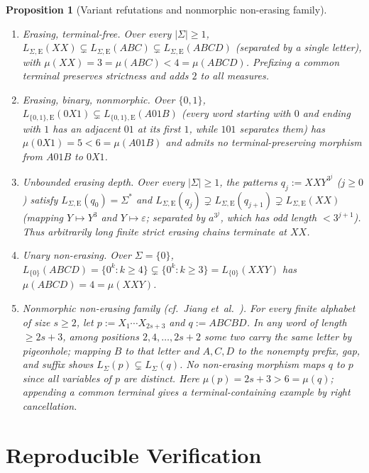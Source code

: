 \documentclass[11pt]{article}
\theoremstyle{plain}
\newtheorem{proposition}[theorem]{Proposition}
\theoremstyle{definition}
\theoremstyle{remark}
\begin{document}
\begin{proposition}[Variant refutations and nonmorphic non-erasing family]\label{prop:variants}
\leavevmode
\begin{enumerate}[label=\textup{(\arabic*)}]
\item \emph{Erasing, terminal-free.} Over every $|\Sigma| \ge 1$, $L_{\Sigma,\mathrm{E}}(XX) \subsetneq L_{\Sigma,\mathrm{E}}(ABC) \subsetneq L_{\Sigma,\mathrm{E}}(ABCD)$ (separated by a single letter), with $\mu(XX) = 3 = \mu(ABC) < 4 = \mu(ABCD)$. Prefixing a common terminal preserves strictness and adds $2$ to all measures.
\item \emph{Erasing, binary, nonmorphic.} Over $\{0,1\}$, $L_{\{0,1\},\mathrm{E}}(0X1) \subsetneq L_{\{0,1\},\mathrm{E}}(A01B)$ (every word starting with $0$ and ending with $1$ has an adjacent $01$ at its first $1$, while $101$ separates them) has $\mu(0X1) = 5 < 6 = \mu(A01B)$ and admits no terminal-preserving morphism from $A01B$ to $0X1$.
\item \emph{Unbounded erasing depth.} Over every $|\Sigma| \ge 1$, the patterns $q_j := XX Y^{3^j}$ ($j \ge 0$) satisfy $L_{\Sigma,\mathrm{E}}(q_0) = \Sigma^*$ and $L_{\Sigma,\mathrm{E}}(q_j) \supsetneq L_{\Sigma,\mathrm{E}}(q_{j+1}) \supsetneq L_{\Sigma,\mathrm{E}}(XX)$ (mapping $Y \mapsto Y^3$ and $Y \mapsto \varepsilon$; separated by $a^{3^j}$, which has odd length $< 3^{j+1}$). Thus arbitrarily long finite strict erasing chains terminate at $XX$.
\item \emph{Unary non-erasing.} Over $\Sigma = \{0\}$, $L_{\{0\}}(ABCD) = \{0^k : k \ge 4\} \subsetneq \{0^k : k \ge 3\} = L_{\{0\}}(XXY)$ has $\mu(ABCD) = 4 = \mu(XXY)$.
\item \emph{Nonmorphic non-erasing family \textup{(cf.\ Jiang et~al.~\cite{Jiang1995})}.} For every finite alphabet of size $s \ge 2$, let $p := X_1 \cdots X_{2s+3}$ and $q := ABCBD$. In any word of length $\ge 2s+3$, among positions $2, 4, \dots, 2s+2$ some two carry the same letter by pigeonhole; mapping $B$ to that letter and $A, C, D$ to the nonempty prefix, gap, and suffix shows $L_\Sigma(p) \subsetneq L_\Sigma(q)$. No non-erasing morphism maps $q$ to $p$ since all variables of $p$ are distinct. Here $\mu(p) = 2s + 3 > 6 = \mu(q)$; appending a common terminal gives a terminal-containing example by right cancellation.
\end{enumerate}
\end{proposition}

\section{Reproducible Verification}
\end{document}

